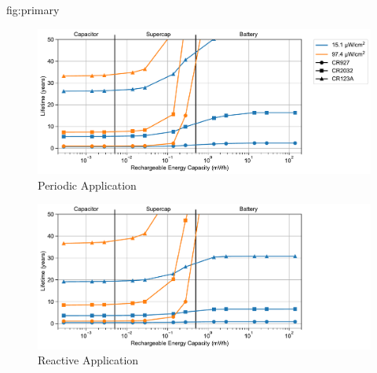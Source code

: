 \begin{definefigure*}{fig:primary}
  \centering
  \begin{subfigure}{\columnwidth}
    \centering
    \includegraphics[width=\linewidth]{figs/capacity/primary/sense_and_send_life_vs_sec_size}
    \caption{Periodic Application}
    \label{fig:primary:sensesec}
  \end{subfigure}
  \begin{subfigure}{\columnwidth}
    \centering
    \includegraphics[width=\linewidth]{figs/capacity/primary/door_occu_life_vs_sec_size}
      \caption{Reactive Application}
    \label{fig:primary:eventsec}
  \end{subfigure}
  \caption{
    \normalfont
    Estimated lifetime
    when varying secondary energy capacity for different harvesting scenarios
    and backup energy storage sizes. 
    The periodic application's period
    is 30\,s and the reactive application events are scaled to
    represent a maximum of 2000 events per hour during the peak hour.
    The backup
    sizes correspond to those found in common coin cell batteries:
    90\,mWh, 720\,mWh, 4500\,mWh for the CR927, CR2032, and CR123A respectively.
    As the ability to capture
    more harvested energy increases, the sensors lifetime increases.
    In some scenarios, expected
    lifetime becomes unbounded as the device is able to subsist entirely on harvested
    energy.
    }
\end{definefigure*}

